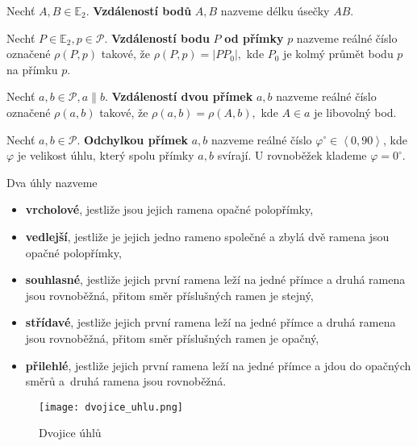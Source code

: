 \begin{definition}
  Nechť $A,B\in \mathbb E_2$. \textbf{Vzdáleností bodů} $A,B$ nazveme délku úsečky $AB.$
\end{definition}


\begin{definition}
  Nechť $P\in \mathbb E_2, p \in \mathscr P.$ \textbf{Vzdáleností bodu} $P$ \textbf{od přímky} $p$ nazveme reálné číslo označené $\rho(P,p)$ takové, že $\rho(P,p)=|PP_0|,$ kde $P_0$ je kolmý průmět bodu $p$ na přímku $p$.
\end{definition}

\begin{definition}
  Nechť $a,b \in \mathscr P, a \parallel b.$ \textbf{Vzdáleností dvou přímek} $a,b$ nazveme reálné číslo označené $\rho(a,b)$ takové, že $\rho(a,b)=\rho(A,b),$ kde $A\in a$ je libovolný bod.
\end{definition}

\begin{definition}
  Nechť $a,b\in \mathscr P.$ \textbf{Odchylkou přímek} $a,b$ nazveme reálné číslo $\varphi^\circ\in \left <0, 90\right>$, kde $\varphi$ je velikost úhlu, který spolu přímky $a,b$ svírají. U rovnoběžek klademe $\varphi = 0^\circ.$
\end{definition}

\begin{definition}
  Dva úhly nazveme
  \begin{itemize}
    \item \textbf{vrcholové}, jestliže jsou jejich ramena opačné polopřímky,
    \item \textbf{vedlejší}, jestliže je jejich jedno rameno společné a zbylá dvě ramena jsou opačné polopřímky,
    \item \textbf{souhlasné}, jestliže jejich první ramena leží na jedné přímce a druhá ramena jsou rovnoběžná, přitom směr příslušných ramen je stejný,
    \item \textbf{střídavé}, jestliže jejich první ramena leží na jedné přímce a druhá ramena jsou rovnoběžná, přitom směr příslušných ramen je opačný,
    \item \textbf{přilehlé}, jestliže jejich první ramena leží na jedné přímce a jdou do opačných směrů a~druhá ramena jsou rovnoběžná.
  \end{itemize}
  \begin{figure}[h!]
    \centering
    \texttt{[image: dvojice\_uhlu.png]}
    \caption{Dvojice úhlů}
  \end{figure}
\end{definition}


